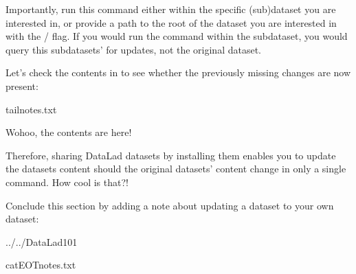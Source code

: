 \sphinxAtStartPar
Importantly, run this command either within the specific
(sub)dataset you are interested in, or provide a path to
the root of the dataset you are interested in with the
/ flag. If you would run the command
within the  subdataset, you would query this
subdatasets’  for updates, not the original
 dataset.

\sphinxAtStartPar
Let’s check the contents in  to see whether
the previously missing changes are now present:

\begin{sphinxVerbatim}[commandchars=\\\{\}]
tailnotes.txt


\end{sphinxVerbatim}

\sphinxAtStartPar
Wohoo, the contents are here!

\sphinxAtStartPar
Therefore, sharing DataLad datasets by installing them
enables you to update the datasets content should the
original datasets’ content change \textendash{} in only a single
command. How cool is that?!

\sphinxAtStartPar
Conclude this section by adding a note about updating a
dataset to your own  dataset:

\begin{sphinxVerbatim}[commandchars=\\\{\}]
../../DataLad\PYGZhy{}101

cat\PYGZlt{}\PYGZlt{}EOT\PYGZgt{}\PYGZgt{}notes.txt

\end{sphinxVerbatim}

